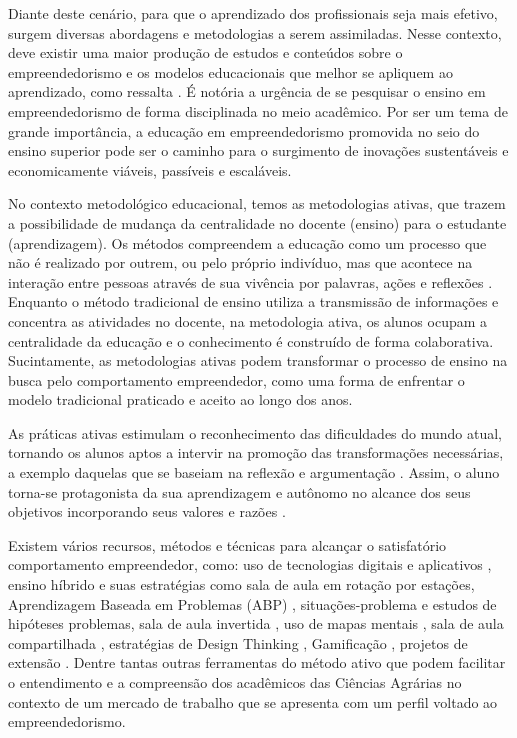 Diante deste cenário, para que o aprendizado dos profissionais seja mais efetivo, surgem diversas abordagens e metodologias a serem assimiladas. Nesse contexto, deve existir uma maior produção de estudos e conteúdos sobre o empreendedorismo e os modelos educacionais que melhor se apliquem ao aprendizado, como ressalta . É notória a urgência de se pesquisar o ensino em empreendedorismo de forma disciplinada no meio acadêmico. Por ser um tema de grande importância, a educação em empreendedorismo promovida no seio do ensino superior pode ser o caminho para o surgimento de inovações sustentáveis e economicamente viáveis, passíveis e escaláveis.

No contexto metodológico educacional, temos as metodologias ativas, que trazem a possibilidade de mudança da centralidade no docente (ensino) para o estudante (aprendizagem). Os métodos compreendem a educação como um processo que não é realizado por outrem, ou pelo próprio indivíduo, mas que acontece na interação entre pessoas através de sua vivência por palavras, ações e reflexões \cite{paiva_metodologias_2016}. Enquanto o método tradicional de ensino utiliza a transmissão de informações e concentra as atividades no docente, na metodologia ativa, os alunos ocupam a centralidade da educação e o conhecimento é construído de forma colaborativa. Sucintamente, as metodologias ativas podem transformar o processo de ensino na busca pelo comportamento empreendedor, como uma forma de enfrentar o modelo tradicional praticado e aceito ao longo dos anos.
 
As práticas ativas estimulam o reconhecimento das dificuldades do mundo atual, tornando os alunos aptos a intervir na promoção das transformações necessárias, a exemplo daquelas que se baseiam na reflexão e argumentação \cite{bezanilla_methodologies_2019}. Assim, o aluno torna-se protagonista da sua aprendizagem e autônomo no alcance dos seus objetivos incorporando seus valores e razões \cite{rubel_student_2016}.

Existem vários recursos, métodos e técnicas para alcançar o satisfatório comportamento empreendedor, como: uso de tecnologias digitais e aplicativos \cite{pereira_use_2020}, ensino híbrido e suas estratégias como sala de aula em rotação por estações, Aprendizagem Baseada em Problemas (ABP) \cite{souza_aprendizagem_2015}, situações-problema e estudos de hipóteses problemas, sala de aula invertida \cite{junior_sala_2016,branco_sala_2016}, uso de mapas mentais \cite{junior_percepcao_2018}, sala de aula compartilhada \cite{strack_por_2009}, estratégias de Design Thinking \cite{andrews_circular_2015}, Gamificação \cite{ogawa_avaliacao_2016}, projetos de extensão \cite{santos_projeto_2019}. Dentre tantas outras ferramentas do método ativo que podem facilitar o entendimento e a compreensão dos acadêmicos das Ciências Agrárias no contexto de um mercado de trabalho que se apresenta com um perfil voltado ao empreendedorismo.

